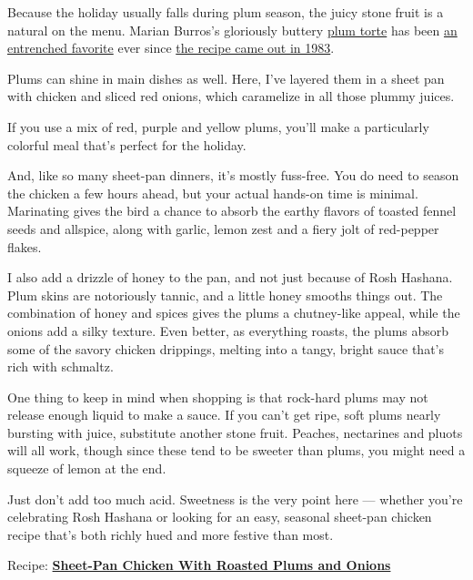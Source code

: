 Because the holiday usually falls during plum season, the juicy stone
fruit is a natural on the menu. Marian Burros's gloriously buttery
\href{https://cooking.nytimes3xbfgragh.onion/recipes/3783-original-plum-torte}{plum
torte} has been
\href{https://www.nytimes3xbfgragh.onion/interactive/2016/09/14/dining/marian-burros-plum-torte-recipe-variations.html}{an
entrenched favorite} ever since
\href{https://www.nytimes3xbfgragh.onion/1983/09/21/garden/food-notes-the-food-at-59th-and-lex.html}{the
recipe came out in 1983}.

Plums can shine in main dishes as well. Here, I've layered them in a
sheet pan with chicken and sliced red onions, which caramelize in all
those plummy juices.

If you use a mix of red, purple and yellow plums, you'll make a
particularly colorful meal that's perfect for the holiday.

And, like so many sheet-pan dinners, it's mostly fuss-free. You do need
to season the chicken a few hours ahead, but your actual hands-on time
is minimal. Marinating gives the bird a chance to absorb the earthy
flavors of toasted fennel seeds and allspice, along with garlic, lemon
zest and a fiery jolt of red-pepper flakes.

I also add a drizzle of honey to the pan, and not just because of Rosh
Hashana. Plum skins are notoriously tannic, and a little honey smooths
things out. The combination of honey and spices gives the plums a
chutney-like appeal, while the onions add a silky texture. Even better,
as everything roasts, the plums absorb some of the savory chicken
drippings, melting into a tangy, bright sauce that's rich with schmaltz.

One thing to keep in mind when shopping is that rock-hard plums may not
release enough liquid to make a sauce. If you can't get ripe, soft plums
nearly bursting with juice, substitute another stone fruit. Peaches,
nectarines and pluots will all work, though since these tend to be
sweeter than plums, you might need a squeeze of lemon at the end.

Just don't add too much acid. Sweetness is the very point here ---
whether you're celebrating Rosh Hashana or looking for an easy, seasonal
sheet-pan chicken recipe that's both richly hued and more festive than
most.

Recipe:
\textbf{\href{https://cooking.nytimes3xbfgragh.onion/recipes/1021408-sheet-pan-chicken-with-roasted-plums-and-onions}{Sheet-Pan
Chicken With Roasted Plums and Onions}}

